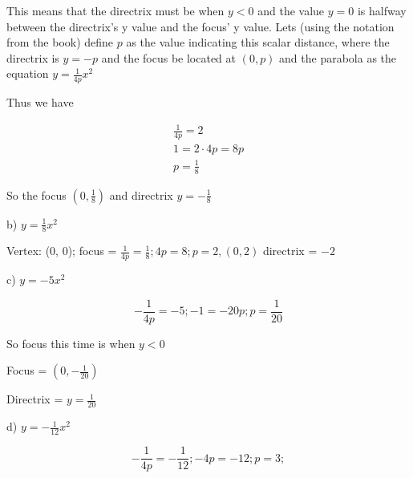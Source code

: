 \documentclass[]{report}
\begin{document}
This means that the directrix must be when $ y < 0 $ and the value $y = 0$ is halfway between the directrix's y value and the focus' y value. Lets (using the notation from the book) define $p$ as the value indicating this scalar distance, where the directrix is $y = -p$ and the focus be located at $(0, p)$ and the parabola as the equation $y = \frac{1}{4p}x^2$

Thus we have

\begin{align*}
\frac{1}{4p} = 2\\
1 = 2 \cdot 4p = 8p\\
p = \frac{1}{8}
\end{align*}

So the focus $(0, \frac{1}{8})$ and directrix $y = - \frac{1}{8}$





b) $y = \frac{1}{8}x^2$


Vertex: (0, 0);
focus = $\frac{1}{4p} = \frac{1}{8}; 4p = 8; p=2, (0, 2)$
directrix = $-2$

c) $y = -5x^2$


\[
-\frac{1}{4p} = -5; -1 = -20p; p=\frac{1}{20}
\]

So focus this time is when $y < 0$

Focus = $(0, -\frac{1}{20})$

Directrix = $y = \frac{1}{20}$

d) $y = -\frac{1}{12}x^2$


\[
-\frac{1}{4p} = -\frac{1}{12}; -4p = -12; p = 3;
\]
\end{document}
